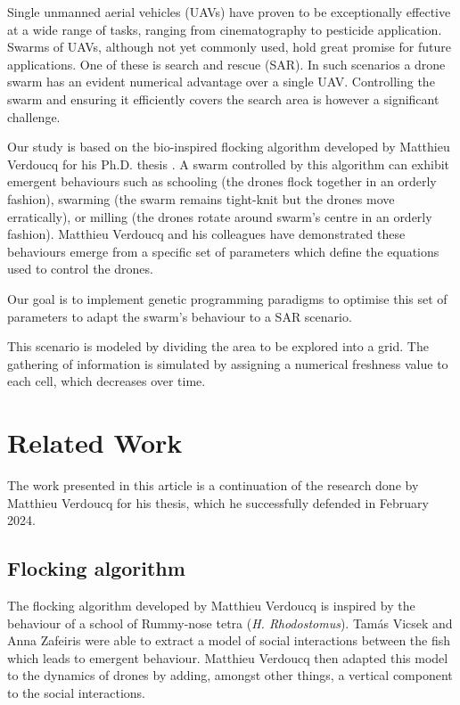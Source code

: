 \documentclass[conference]{IEEEtran}
\begin{document}
Single unmanned aerial vehicles (UAVs) have proven to be exceptionally effective at a wide range of tasks, ranging from cinematography to pesticide application. Swarms of UAVs, although not yet commonly used, hold great promise for future applications. One of these is search and rescue (SAR). In such scenarios a drone swarm has an evident numerical advantage over a single UAV. Controlling the swarm and ensuring it efficiently covers the search area is however a significant challenge. 

Our study is based on the bio-inspired flocking algorithm developed by Matthieu Verdoucq for his Ph.D. thesis \cite{verdoucq_controbio-inspire_2024}. A swarm controlled by this algorithm can exhibit emergent behaviours such as schooling (the drones flock together in an orderly fashion), swarming (the swarm remains tight-knit but the drones move erratically), or milling (the drones rotate around swarm's centre in an orderly fashion). Matthieu Verdoucq and his colleagues \cite{verdoucq_bio-inspired_2022} have demonstrated these behaviours emerge from a specific set of parameters which define the equations used to control the drones.

Our goal is to implement genetic programming paradigms to optimise this set of parameters to adapt the swarm's behaviour to a SAR scenario.

This scenario is modeled by dividing the area to be explored into a grid. The gathering of information is simulated by assigning a numerical freshness value to each cell, which decreases over time.

\section{Related Work}
\label{sec:RW}

The work presented in this article is a continuation of the research done by Matthieu Verdoucq for his thesis, which he successfully defended in February 2024.  

\subsection{Flocking algorithm}

The flocking algorithm developed by Matthieu Verdoucq\cite{verdoucq_controbio-inspire_2024} is inspired by the behaviour of a school of Rummy-nose tetra (\emph{H. Rhodostomus}). Tamás Vicsek and Anna Zafeiris \cite{vicsek_collective_2012} were able to extract a model of social interactions between the fish which leads to emergent behaviour. Matthieu Verdoucq then adapted this model to the dynamics of drones by adding, amongst other things, a vertical component to the social interactions.
\end{document}
